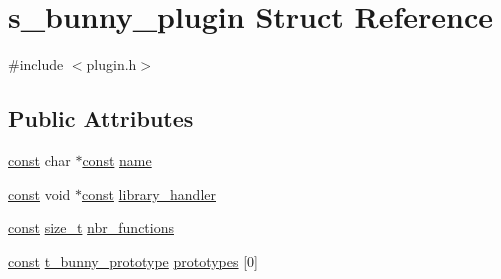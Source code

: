 \hypertarget{structs__bunny__plugin}{\section{s\-\_\-bunny\-\_\-plugin Struct Reference}
\label{structs__bunny__plugin}
}


{\ttfamily \#include $<$plugin.\-h$>$}

\subsection*{Public Attributes}
\begin{DoxyCompactItemize}
\item 
\hyperlink{term__entry_8h_a57bd63ce7f9a353488880e3de6692d5a}{const} char $\ast$\hyperlink{term__entry_8h_a57bd63ce7f9a353488880e3de6692d5a}{const} \hyperlink{structs__bunny__plugin_ae5f992eeb22aefab2ed1a5d3b81b646a}{name}
\item 
\hyperlink{term__entry_8h_a57bd63ce7f9a353488880e3de6692d5a}{const} void $\ast$\hyperlink{term__entry_8h_a57bd63ce7f9a353488880e3de6692d5a}{const} \hyperlink{structs__bunny__plugin_acdb9c7f468241e8ae0b5b3ae9fc38ca0}{library\-\_\-handler}
\item 
\hyperlink{term__entry_8h_a57bd63ce7f9a353488880e3de6692d5a}{const} \hyperlink{nc__alloc_8h_a7b60c5629e55e8ec87a4547dd4abced4}{size\-\_\-t} \hyperlink{structs__bunny__plugin_ab180c473724f136b8d177c758ea8e9c7}{nbr\-\_\-functions}
\item 
\hyperlink{term__entry_8h_a57bd63ce7f9a353488880e3de6692d5a}{const} \hyperlink{plugin_8h_a5fb3f2be080f97ed3a49a79e0de92a98}{t\-\_\-bunny\-\_\-prototype} \hyperlink{structs__bunny__plugin_a3e1d1c9c7e24b3b379c274dc775bf4f8}{prototypes} \mbox{[}0\mbox{]}
\end{DoxyCompactItemize}



